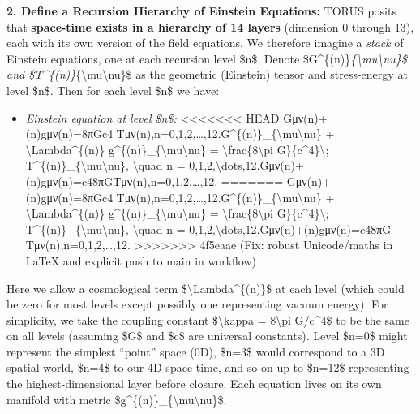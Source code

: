 \documentclass[]{article}
\begin{document}
\textbf{2. Define a Recursion Hierarchy of Einstein Equations:} TORUS
posits that \textbf{space-time exists in a hierarchy of 14 layers}
(dimension 0 through 13), each with its own version of the field
equations​. We therefore imagine a \emph{stack} of Einstein equations,
one at each recursion level \$n\$. Denote
\$G\^{}\{(n)\}\emph{\{\textbackslash{}mu\textbackslash{}nu\}\$ and
\$T\^{}\{(n)\}}\{\textbackslash{}mu\textbackslash{}nu\}\$ as the
geometric (Einstein) tensor and stress-energy at level \$n\$. Then for
each level \$n\$ we have:

\begin{itemize}
\item
  \emph{Einstein equation at level \$n\$:}
<<<<<<< HEAD
  Gμν(n)+\Lambda(n)gμν(n)=8πGc4  Tμν(n),n=0,1,2,\ldots,12.G\^{}\{(n)\}\_\{\textbackslash mu\textbackslash nu\}
  + \textbackslash Lambda\^{}\{(n)\}
  g\^{}\{(n)\}\_\{\textbackslash mu\textbackslash nu\} =
  \textbackslash frac\{8\textbackslash pi G\}\{c\^{}4\}\textbackslash;
  T\^{}\{(n)\}\_\{\textbackslash mu\textbackslash nu\},
  \textbackslash quad n =
  0,1,2,\textbackslash dots,12.Gμν(n)\hspace{0pt}+\Lambda(n)gμν(n)\hspace{0pt}=c48πG\hspace{0pt}Tμν(n)\hspace{0pt},n=0,1,2,\ldots,12.
=======
  Gμν(n)+\Lambda(n)gμν(n)=8πGc4  Tμν(n),n=0,1,2,\ldots{},12.G\^{}\{(n)\}\_\{\textbackslash{}mu\textbackslash{}nu\}
  + \textbackslash{}Lambda\^{}\{(n)\}
  g\^{}\{(n)\}\_\{\textbackslash{}mu\textbackslash{}nu\} =
  \textbackslash{}frac\{8\textbackslash{}pi
  G\}\{c\^{}4\}\textbackslash{};
  T\^{}\{(n)\}\_\{\textbackslash{}mu\textbackslash{}nu\},
  \textbackslash{}quad n =
  0,1,2,\textbackslash{}dots,12.Gμν(n)​+\Lambda(n)gμν(n)​=c48πG​Tμν(n)​,n=0,1,2,\ldots{},12.
>>>>>>> 4f5eaae (Fix: robust Unicode/maths in LaTeX and explicit push to main in workflow)
\end{itemize}

Here we allow a cosmological term \$\textbackslash{}Lambda\^{}\{(n)\}\$
at each level (which could be zero for most levels except possibly one
representing vacuum energy). For simplicity, we take the coupling
constant \$\textbackslash{}kappa = 8\textbackslash{}pi G/c\^{}4\$ to be
the same on all levels (assuming \$G\$ and \$c\$ are universal
constants)​. Level \$n=0\$ might represent the simplest ``point'' space
(0D), \$n=3\$ would correspond to a 3D spatial world, \$n=4\$ to our 4D
space-time, and so on up to \$n=12\$ representing the
highest-dimensional layer before closure. Each equation lives on its own
manifold with metric
\$g\^{}\{(n)\}\_\{\textbackslash{}mu\textbackslash{}nu\}\$.
\end{document}
